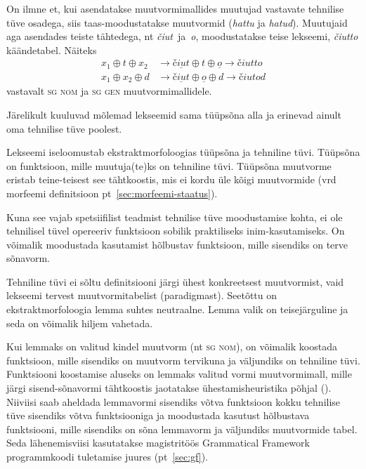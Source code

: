 \documentclass[12pt,a4paper]{article}
\newcommand{\vadja}[1]{\textit{#1}}
\newcommand{\msd}[1]{\textsc{#1}}
\begin{document}
On ilmne et, kui asendatakse muutvormimallides muutujad vastavate tehnilise tüve osadega, siis taas-moodustatakse muutvormid (\vadja{hattu} ja \vadja{hatud}). Muutujaid aga asendades teiste tähtedega, %
nt \textit{čiut}~ja~\textit{o}, moodustatakse teise lekseemi, \vadja{čiutto} käändetabel. Näiteks
\begin{align*}
  x_1 \oplus t \oplus x_2 &\rightarrow \underline{\textit{čiut}} \oplus \textit{t} \oplus \underline{\textit{o}} \rightarrow \textit{čiutto} \nonumber \\
  x_1 \oplus x_2 \oplus d &\rightarrow \underline{\textit{čiut}} \oplus \underline{\textit{o}} \oplus \textit{d} \rightarrow \textit{čiutod} \nonumber
\end{align*}
vastavalt \msd{sg nom} ja \msd{sg gen} muutvormi\-mallidele.

Järelikult kuuluvad mõlemad lekseemid sama tüüpsõna alla ja erinevad ainult oma tehnilise tüve poolest.

Lekseemi iseloomustab ekstraktmorfoloogias tüüpsõna ja tehniline tüvi. Tüüpsõna on funktsioon, mille muutuja(te)ks on tehniline tüvi. Tüüpsõna muutvorme eristab teine-teisest see tähtkoostis, mis ei kordu üle kõigi muutvormide (vrd morfeemi definitsioon pt~\ref{sec:morfeemi-staatus}).

Kuna see vajab spetsiifilist teadmist tehnilise tüve moodustamise kohta, ei ole tehnilisel tüvel opereeriv funktsioon sobilik praktiliseks inim-kasutamiseks. On võimalik moodustada kasutamist hõlbustav funktsioon, mille sisendiks on terve sõnavorm.

Tehniline tüvi ei sõltu definitsiooni järgi ühest konkreetsest muutvormist, vaid lekseemi tervest muutvormi\-tabelist (paradigmast). Seetõttu on ekstrakt\-morfoloogia lemma suhtes neutraalne. Lemma valik on teise\-järguline ja seda on võimalik hiljem vahetada. %

Kui lemmaks on valitud kindel muutvorm (nt \msd{sg nom}), on võimalik koostada funktsioon, mille sisendiks on muutvorm tervikuna ja väljundiks on tehniline tüvi. Funktsiooni koostamise aluseks on lemmaks valitud vormi muutvormi\-mall, mille järgi sisend-sõnavormi tähtkoostis jaotatakse ühestamisheuristika põhjal (\cite[572]{ahlberg_semi-supervised_2014}). Niiviisi saab aheldada lemmavormi sisendiks võtva funktsioon kokku tehnilise tüve sisendiks võtva funktsiooniga ja moodustada kasutust hõlbustava funktsiooni, mille sisendiks on sõna lemmavorm ja väljundiks muutvormide tabel. Seda lähenemisviisi kasutatakse magistritöös Grammatical Framework programmkoodi tuletamise juures (pt~\ref{sec:gf}). %
\end{document}
